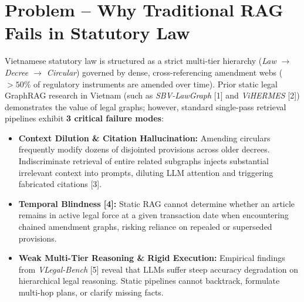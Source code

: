 \documentclass[10pt,a4paper]{article}
\begin{document}
\section{Problem -- Why Traditional RAG Fails in Statutory Law}
Vietnamese statutory law is structured as a strict multi-tier hierarchy (\textit{Law $\rightarrow$ Decree $\rightarrow$ Circular}) governed by dense, cross-referencing amendment webs ($>50\%$ of regulatory instruments are amended over time). Prior static legal GraphRAG research in Vietnam (such as \textit{SBV-LawGraph} [1] and \textit{ViHERMES} [2]) demonstrates the value of legal graphs; however, standard single-pass retrieval pipelines exhibit \textbf{3 critical failure modes}:
\begin{itemize}
  \item \textbf{Context Dilution \& Citation Hallucination:} Amending circulars frequently modify dozens of disjointed provisions across older decrees. Indiscriminate retrieval of entire related subgraphs injects substantial irrelevant context into prompts, diluting LLM attention and triggering fabricated citations [3].
  \item \textbf{Temporal Blindness [4]:} Static RAG cannot determine whether an article remains in active legal force at a given transaction date when encountering chained amendment graphs, risking reliance on repealed or superseded provisions.
  \item \textbf{Weak Multi-Tier Reasoning \& Rigid Execution:} Empirical findings from \textit{VLegal-Bench} [5] reveal that LLMs suffer steep accuracy degradation on hierarchical legal reasoning. Static pipelines cannot backtrack, formulate multi-hop plans, or clarify missing facts.
\end{itemize}

\end{document}
